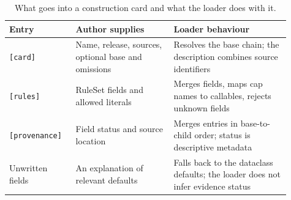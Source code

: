 \begin{table}[!htbp]
\centering\small
\caption{What goes into a construction card and what the loader does with it.}
\label{tab:provenance-schema}
\begin{tabular}{@{} >{\raggedright\arraybackslash}p{0.21\linewidth} >{\raggedright\arraybackslash}p{0.32\linewidth} >{\raggedright\arraybackslash}p{0.38\linewidth} @{}}
\toprule
\rowcolor{tableblue} \textbf{Entry} & \textbf{Author supplies} & \textbf{Loader behaviour} \\
\midrule
\texttt{[card]} & Name, release, sources, optional base and omissions & Resolves the base chain; the description combines source identifiers \\
\texttt{[rules]} & RuleSet fields and allowed literals & Merges fields, maps cap names to callables, rejects unknown fields \\
\texttt{[provenance]} & Field status and source location & Merges entries in base-to-child order; status is descriptive metadata \\
Unwritten fields & An explanation of relevant defaults & Falls back to the dataclass defaults; the loader does not infer evidence status \\
\bottomrule
\end{tabular}
\end{table}
